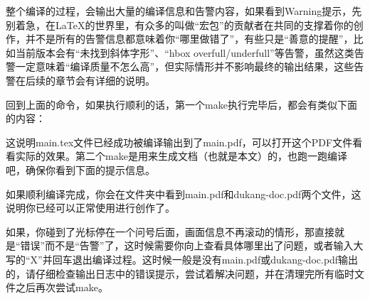 整个编译的过程，会输出大量的编译信息和告警内容，如果看到Warning提示，先别着急，在{\LaTeX}的世界里，有众多的叫做“宏包”的贡献者在共同的支撑着你的创作，并不是所有的告警信息都意味着你“哪里做错了”，有些只是“善意的提醒”，比如{\dk}当前版本会有“未找到斜体字形”、“hbox overfull/underfull”等告警，虽然这类告警一定意味着“编译质量不怎么高”，但实际情形并不影响最终的输出结果，这些告警在后续的章节会有详细的说明。

回到上面的命令，如果执行顺利的话，第一个make执行完毕后，都会有类似下面的内容：

\vspace{1em}
\begin{center}
\end{center}
\vspace{1em}

这说明main.tex文件已经成功被编译输出到了main.pdf，可以打开这个PDF文件看看实际的效果。第二个make是用来生成{\dk}文档（也就是本文）的，也跑一跑编译吧，确保你看到下面的提示信息。

\vspace{1em}
\begin{center}
\end{center}
\vspace{1em}

如果顺利编译完成，你会在文件夹中看到main.pdf和dukang-doc.pdf两个文件，这说明你已经可以正常使用{\dk}进行创作了。

如果，你碰到了光标停在一个问号后面，画面信息不再滚动的情形，那直接就是“错误”而不是“告警”了，这时候需要你向上查看具体哪里出了问题，或者输入大写的“X”并回车退出编译过程。这时候一般是没有main.pdf或dukang-doc.pdf输出的，请仔细检查输出日志中的错误提示，尝试着解决问题，并在清理完所有临时文件之后再次尝试make。


\clearpage
